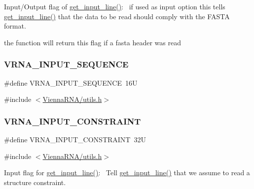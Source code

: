 Input/\+Output flag of \mbox{\hyperlink{group__utils_ga8ef1835eb83f542396f59f0b205965e5}{get\+\_\+input\+\_\+line()}}\+:~\newline
if used as input option this tells \mbox{\hyperlink{group__utils_ga8ef1835eb83f542396f59f0b205965e5}{get\+\_\+input\+\_\+line()}} that the data to be read should comply with the F\+A\+S\+TA format. 

the function will return this flag if a fasta header was read \mbox{\label{group__utils_ga8566d6787972100e68b5a2a159b4cf45}} 
\subsubsection{\texorpdfstring{V\+R\+N\+A\+\_\+\+I\+N\+P\+U\+T\+\_\+\+S\+E\+Q\+U\+E\+N\+CE}{VRNA\_INPUT\_SEQUENCE}}
{\footnotesize\ttfamily \#define V\+R\+N\+A\+\_\+\+I\+N\+P\+U\+T\+\_\+\+S\+E\+Q\+U\+E\+N\+CE~16U}



{\ttfamily \#include $<$\mbox{\hyperlink{utils_8h}{Vienna\+R\+N\+A/utils.\+h}}$>$}

\mbox{\label{group__utils_gac08a9df45b9721b97a47dbfe7a6e5f85}} 
\subsubsection{\texorpdfstring{V\+R\+N\+A\+\_\+\+I\+N\+P\+U\+T\+\_\+\+C\+O\+N\+S\+T\+R\+A\+I\+NT}{VRNA\_INPUT\_CONSTRAINT}}
{\footnotesize\ttfamily \#define V\+R\+N\+A\+\_\+\+I\+N\+P\+U\+T\+\_\+\+C\+O\+N\+S\+T\+R\+A\+I\+NT~32U}



{\ttfamily \#include $<$\mbox{\hyperlink{utils_8h}{Vienna\+R\+N\+A/utils.\+h}}$>$}



Input flag for \mbox{\hyperlink{group__utils_ga8ef1835eb83f542396f59f0b205965e5}{get\+\_\+input\+\_\+line()}}\+:~\newline
Tell \mbox{\hyperlink{group__utils_ga8ef1835eb83f542396f59f0b205965e5}{get\+\_\+input\+\_\+line()}} that we assume to read a structure constraint. 


